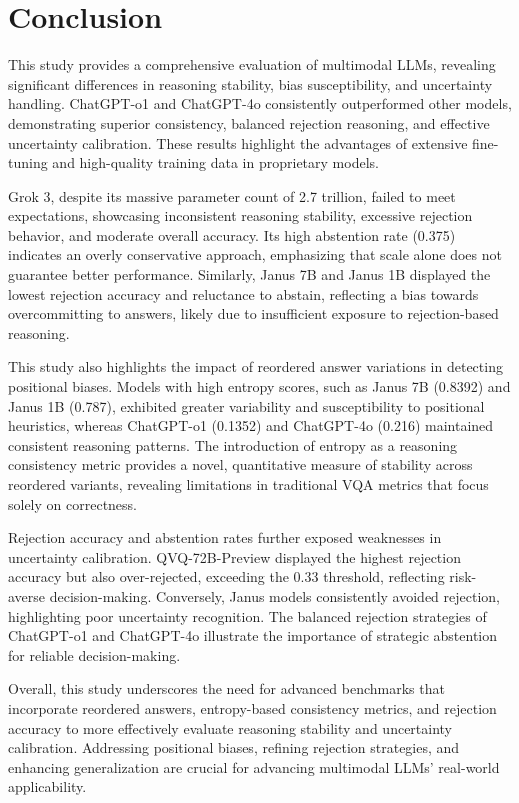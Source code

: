 \section{Conclusion} \label{sec:conclusion}


This study provides a comprehensive evaluation of multimodal LLMs, revealing significant differences in reasoning stability, bias susceptibility, and uncertainty handling. ChatGPT-o1 and ChatGPT-4o consistently outperformed other models, demonstrating superior consistency, balanced rejection reasoning, and effective uncertainty calibration. These results highlight the advantages of extensive fine-tuning and high-quality training data in proprietary models.

Grok 3, despite its massive parameter count of 2.7 trillion, failed to meet expectations, showcasing inconsistent reasoning stability, excessive rejection behavior, and moderate overall accuracy. Its high abstention rate (0.375) indicates an overly conservative approach, emphasizing that scale alone does not guarantee better performance. Similarly, Janus 7B and Janus 1B displayed the lowest rejection accuracy and reluctance to abstain, reflecting a bias towards overcommitting to answers, likely due to insufficient exposure to rejection-based reasoning.

This study also highlights the impact of reordered answer variations in detecting positional biases. Models with high entropy scores, such as Janus 7B (0.8392) and Janus 1B (0.787), exhibited greater variability and susceptibility to positional heuristics, whereas ChatGPT-o1 (0.1352) and ChatGPT-4o (0.216) maintained consistent reasoning patterns. The introduction of entropy as a reasoning consistency metric provides a novel, quantitative measure of stability across reordered variants, revealing limitations in traditional VQA metrics that focus solely on correctness.

Rejection accuracy and abstention rates further exposed weaknesses in uncertainty calibration. QVQ-72B-Preview displayed the highest rejection accuracy but also over-rejected, exceeding the 0.33 threshold, reflecting risk-averse decision-making. Conversely, Janus models consistently avoided rejection, highlighting poor uncertainty recognition. The balanced rejection strategies of ChatGPT-o1 and ChatGPT-4o illustrate the importance of strategic abstention for reliable decision-making.

Overall, this study underscores the need for advanced benchmarks that incorporate reordered answers, entropy-based consistency metrics, and rejection accuracy to more effectively evaluate reasoning stability and uncertainty calibration. Addressing positional biases, refining rejection strategies, and enhancing generalization are crucial for advancing multimodal LLMs' real-world applicability.